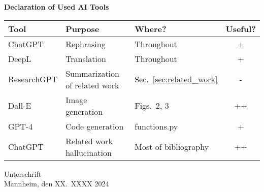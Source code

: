 \documentclass[a4paper,oneside,bibliography=totoc]{scrartcl}
\begin{document}
\begin{center}
  \textbf{Declaration of Used AI Tools} \\[.3em]
  \begin{tabularx}{\textwidth}{lXlc}
    \toprule
    Tool & Purpose & Where? & Useful? \\
    \midrule
    ChatGPT & Rephrasing & Throughout & + \\
    DeepL & Translation & Throughout & + \\
    ResearchGPT & Summarization of related work & Sec.~\ref{sec:related_work} & - \\
    Dall-E & Image generation & Figs.~2, 3 & ++ \\
    GPT-4 & Code generation & functions.py & + \\
    ChatGPT & Related work hallucination & Most of bibliography & ++ \\
    \bottomrule
  \end{tabularx}
\end{center}

\vspace{2cm}
\noindent Unterschrift\\
\noindent Mannheim, den XX.~XXXX 2024 \hfill
\end{document}
